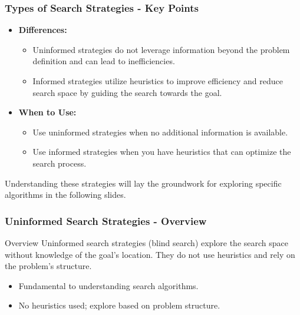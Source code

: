 \documentclass[aspectratio=169]{beamer}
\begin{document}
\begin{frame}[fragile]
    \frametitle{Types of Search Strategies - Key Points}
    \begin{itemize}
        \item \textbf{Differences:}
            \begin{itemize}
                \item Uninformed strategies do not leverage information beyond the problem definition and can lead to inefficiencies.
                \item Informed strategies utilize heuristics to improve efficiency and reduce search space by guiding the search towards the goal.
            \end{itemize}
        \item \textbf{When to Use:}
            \begin{itemize}
                \item Use uninformed strategies when no additional information is available.
                \item Use informed strategies when you have heuristics that can optimize the search process.
            \end{itemize}
    \end{itemize}
    Understanding these strategies will lay the groundwork for exploring specific algorithms in the following slides.
\end{frame}

\begin{frame}[fragile]
    \frametitle{Uninformed Search Strategies - Overview}
    \begin{block}{Overview}
        Uninformed search strategies (blind search) explore the search space without knowledge of the goal's location. They do not use heuristics and rely on the problem's structure.
    \end{block}
    
    \begin{itemize}
        \item Fundamental to understanding search algorithms.
        \item No heuristics used; explore based on problem structure.
    \end{itemize}
\end{frame}
\end{document}
